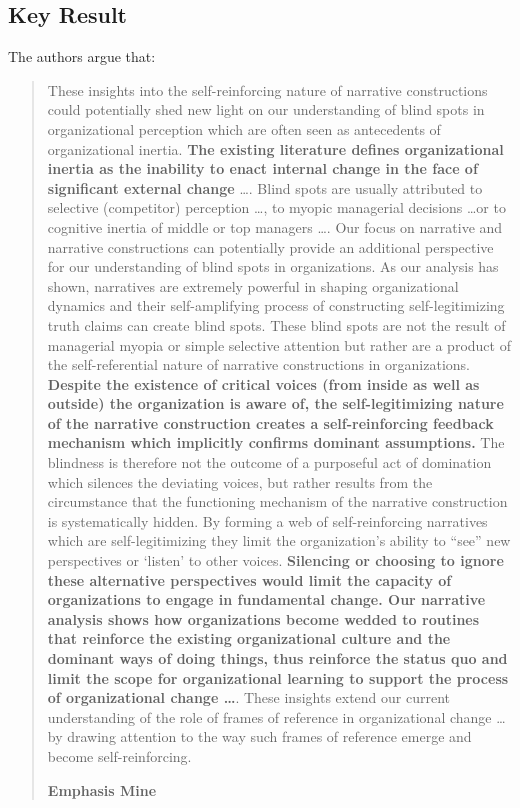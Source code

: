 \subsection{Key Result}
The authors argue that:\\
\begin{quote}
 These insights into the self-reinforcing nature of narrative constructions could potentially shed new light on our understanding of blind spots in organizational perception which are often seen as antecedents of organizational inertia. {\bf The existing literature defines organizational inertia as the inability to enact internal change in the face of significant external change} \ldots . Blind spots are usually attributed to selective (competitor) perception \ldots, to myopic managerial decisions \ldots  or to cognitive inertia of middle or top managers \ldots . Our focus on narrative and narrative constructions can potentially provide an additional perspective for our understanding of blind spots in organizations. As our analysis has shown, narratives are extremely powerful in shaping organizational dynamics and their self-amplifying process of constructing self-legitimizing truth claims can create blind spots. These blind spots are not the result of managerial myopia or simple selective attention but rather are a product of the self-referential nature of narrative constructions in organizations. {\bf Despite the existence of critical voices (from inside as well as outside) the organization is aware of, the self-legitimizing nature of the narrative construction creates a self-reinforcing feedback mechanism which implicitly confirms dominant assumptions.} The blindness is therefore not the outcome of a purposeful act of domination which silences the deviating voices, but rather results from the circumstance that the functioning mechanism of the narrative construction is systematically hidden. By forming a web of self-reinforcing narratives which are self-legitimizing they limit the organization’s ability to “see” new perspectives or ‘listen’ to other voices. {\bf Silencing or choosing to ignore these alternative perspectives would limit the capacity of organizations to engage in fundamental change. Our narrative analysis shows how organizations become wedded to routines that reinforce the existing organizational culture and the dominant ways of doing things, thus reinforce the status quo and limit the scope for organizational learning to support the process of organizational change \ldots}. These insights extend our current understanding of the role of frames of reference in organizational change \ldots by drawing attention to the way such frames of reference emerge and become self-reinforcing.\\
\begin{flushright}
{\bf Emphasis Mine}
\end{flushright}
\end{quote}

